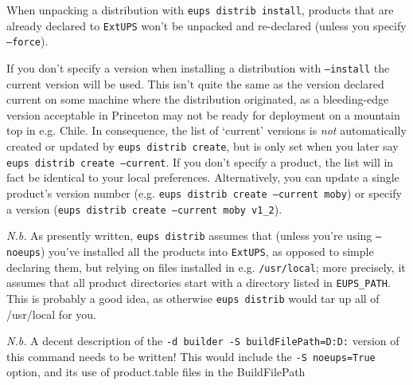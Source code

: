 \documentclass{article}
\newcommand{\code}[1]{\texttt{#1}}
\newcommand{\eups}{\code{ExtUPS}\xspace}
\begin{document}
When unpacking a distribution with \code{eups distrib install}, products that are
already declared to \eups won't be unpacked and re-declared (unless you specify \code{--force}).

If you don't specify a version when installing a distribution with
\code{--install} the current version will be used.  This isn't quite the same
as the version declared current on some machine where the distribution
originated, as a bleeding-edge version acceptable in Princeton may not
be ready for deployment on a mountain top in e.g. Chile. In
consequence, the list of `current' versions is \textit{not}
automatically created or updated by \code{eups distrib create}, but is
only set when you later say \code{eups distrib create --current}.  If you don't specify
a product, the list will in fact be identical to your local preferences.
Alternatively, you can update a single product's version number (e.g.
\code{eups distrib create --current moby}) or specify a version (\code{eups distrib create --current moby v1\_2}).

\textit{N.b.} As presently written, \code{eups distrib} assumes that (unless you're
using \code{--noeups}) you've
installed all the products into \eups, as opposed to simple declaring them, but
relying on files installed in e.g. \code{/usr/local}; more precisely, it assumes
that all product directories start with a directory listed in \code{EUPS\_PATH}.
This is probably a good idea, as otherwise \code{eups distrib} would tar up
all of /usr/local for you.

\textit{N.b.} A decent description of the \code{-d builder -S buildFilePath=D:D:} version of this command
needs to be written!  This would include the \code{-S noeups=True} option, and its use
of product.table files in the BuildFilePath
\end{document}
